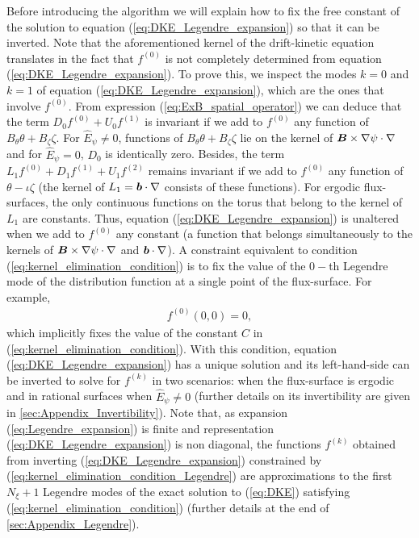 Before introducing the algorithm we will explain how to fix the free constant of the solution to equation (\ref{eq:DKE_Legendre_expansion}) so that it can be inverted. Note that the aforementioned kernel of the drift-kinetic equation translates in the fact that $f^{(0)}$ is not completely determined from equation (\ref{eq:DKE_Legendre_expansion}). To prove this, we inspect the modes $k=0$ and $k=1$ of equation (\ref{eq:DKE_Legendre_expansion}), which are the ones that involve $f^{(0)}$. From expression (\ref{eq:ExB_spatial_operator}) we can deduce that the term $D_0 f^{(0)} + U_0 f^{(1)} $ is invariant if we add to $f^{(0)}$ any function of $B_\theta \theta + B_\zeta  \zeta$. For $\widehat{E}_\psi\ne 0$, functions of $B_\theta \theta + B_\zeta  \zeta$ lie on the kernel of $\vb*{B}\times\nabla \psi \cdot \nabla$ and for $\widehat{E}_\psi = 0$, $D_0$ is identically zero. Besides, the term $L_1 f^{(0)} + D_1 f^{(1)} + U_1 f^{(2)}$ remains invariant if we add to $f^{(0)} $ any function of $\theta-\iota\zeta$ (the kernel of $L_1=\vb*{b}\cdot\nabla$ consists of these functions). For ergodic flux-surfaces, the only continuous functions on the torus that belong to the kernel of $L_1$ are constants. Thus, equation (\ref{eq:DKE_Legendre_expansion}) is unaltered when we add to $f^{(0)}$ any constant (a function that belongs simultaneously to the kernels of $\vb*{B}\times\nabla \psi \cdot \nabla$ and $\vb*{b}\cdot\nabla$). A constraint equivalent to condition (\ref{eq:kernel_elimination_condition}) is to fix the value of the $0-$th Legendre mode of the distribution function at a single point of the flux-surface. For example,
 \begin{align}
 	f^{(0)}(0,0)=0, \label{eq:kernel_elimination_condition_Legendre}
 \end{align}
which implicitly fixes the value of the constant $C$ in (\ref{eq:kernel_elimination_condition}).
 With this condition, equation (\ref{eq:DKE_Legendre_expansion}) has a unique solution and its left-hand-side can be inverted  to solve for $f^{(k)}$ in two scenarios: when the flux-surface is ergodic and in rational surfaces when $\widehat{E}_\psi\ne0$ (further details on its invertibility are given in \ref{sec:Appendix_Invertibility}). Note that, as expansion (\ref{eq:Legendre_expansion}) is finite and representation (\ref{eq:DKE_Legendre_expansion}) is non diagonal, the functions $f^{(k)}$ obtained from inverting (\ref{eq:DKE_Legendre_expansion}) constrained by (\ref{eq:kernel_elimination_condition_Legendre}) are approximations to the first $N_\xi+1$ Legendre modes of the exact solution to (\ref{eq:DKE}) satisfying (\ref{eq:kernel_elimination_condition}) (further details at the end of \ref{sec:Appendix_Legendre}).
 
